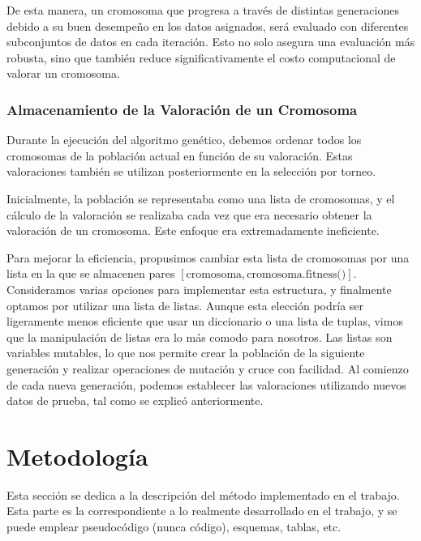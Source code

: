 \documentclass[conference,a4paper]{IEEEtran}
\begin{document}
De esta manera, un cromosoma que progresa a través de distintas generaciones debido a su buen desempeño en los datos asignados, será evaluado con diferentes subconjuntos de datos en cada iteración. Esto no solo asegura una evaluación más robusta, sino que también reduce significativamente el costo computacional de valorar un cromosoma.


\subsubsection{Almacenamiento de la Valoración de un Cromosoma}
Durante la ejecución del algoritmo genético, debemos ordenar todos los cromosomas de la población actual en función de su valoración. Estas valoraciones también se utilizan posteriormente en la selección por torneo.

Inicialmente, la población se representaba como una lista de cromosomas, y el cálculo de la valoración se realizaba cada vez que era necesario obtener la valoración de un cromosoma. Este enfoque era extremadamente ineficiente.

Para mejorar la eficiencia, propusimos cambiar esta lista de cromosomas por una lista en la que se almacenen pares \([\text{cromosoma}, \text{cromosoma.fitness()}]\). Consideramos varias opciones para implementar esta estructura, y finalmente optamos por utilizar una lista de listas. Aunque esta elección podría ser ligeramente menos eficiente que usar un diccionario o una lista de tuplas, vimos que la manipulación de listas era lo más comodo para nosotros. Las listas son variables mutables, lo que nos permite crear la población de la siguiente generación y realizar operaciones de mutación y cruce con facilidad. Al comienzo de cada nueva generación, podemos establecer las valoraciones utilizando nuevos datos de prueba, tal como se explicó anteriormente.


\section{Metodología}

Esta sección se dedica a la descripción del método implementado en el trabajo.
Esta parte es la correspondiente a lo realmente desarrollado en el trabajo, y
se puede emplear pseudocódigo (nunca código), esquemas, tablas, etc.
\end{document}
